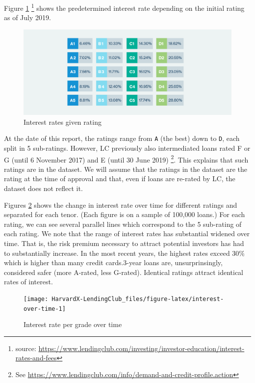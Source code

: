 \documentclass[11pt,]{report}
\let\rmarkdownfootnote\footnote%
\def\footnote{\protect\rmarkdownfootnote}
\begin{document}
Figure \ref{fig:interest-rate-table} \footnote{source: \url{https://www.lendingclub.com/investing/investor-education/interest-rates-and-fees}} shows the predetermined interest rate depending on the initial rating as of July 2019.

\small

\begin{figure}

{\centering \includegraphics[width=0.7\linewidth]{images/interest-rates-jul2019} 

}

\caption{Interest rates given rating}\label{fig:interest-rate-table}
\end{figure}

\normalsize

At the date of this report, the ratings range from \texttt{A} (the best) down to \texttt{D}, each split in 5 sub-ratings. However, LC previously also intermediated loans rated F or G (until 6 November 2017) and E (until 30 June 2019) \footnote{See \url{https://www.lendingclub.com/info/demand-and-credit-profile.action}}. This explains that such ratings are in the dataset. We will assume that the ratings in the dataset are the rating at the time of approval and that, even if loans are re-rated by LC, the dataset does not reflect it.

Figures \ref{fig:interest-over-time} shows the change in interest rate over time for different ratings and separated for each tenor. (Each figure is on a sample of 100,000 loans.) For each rating, we can see several parallel lines which correspond to the 5 sub-rating of each rating. We note that the range of interest rates has substantial widened over time. That is, the risk premium necessary to attract potential investors has had to substantially increase. In the most recent years, the highest rates exceed 30\% which is higher than many credit cards.3-year loans are, unsurprinsingly, considered safer (more A-rated, less G-rated). Identical ratings attract identical rates of interest.

\small

\begin{figure}

{\centering \texttt{[image: HarvardX-LendingClub\_files/figure-latex/interest-over-time-1]} 

}

\caption{Interest rate per grade over time}\label{fig:interest-over-time}
\end{figure}
\end{document}

